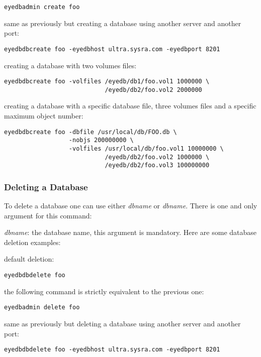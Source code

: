 \verbsize
\begin{verbatim}
eyedbadmin create foo
\end{verbatim}
\normalsize
\item same as previously but creating a database using another server
and another port:
\verbsize
\begin{verbatim}
eyedbdbcreate foo -eyedbhost ultra.sysra.com -eyedbport 8201
\end{verbatim}
\normalsize
\item creating a database with two volumes files:
\verbsize
\begin{verbatim}
eyedbdbcreate foo -volfiles /eyedb/db1/foo.vol1 1000000 \
                            /eyedb/db2/foo.vol2 2000000
\end{verbatim}
\normalsize
\item creating a database with a specific database file,
three volumes files and a specific maximum object number:
\verbsize
\begin{verbatim}
eyedbdbcreate foo -dbfile /usr/local/db/FOO.db \
                  -nobjs 200000000 \
                  -volfiles /usr/local/db/foo.vol1 10000000 \
                            /eyedb/db2/foo.vol2 1000000 \
                            /eyedb/db2/foo.vol3 100000000
\end{verbatim}
\normalsize
\ei
\subsubsection{Deleting a Database}
To delete a database one can use either  \emph{dbname}
or  \emph{dbname}.
There is one and only argument for this command:
\bi
\item \emph{dbname}: the database name, this argument is mandatory.
\ei
Here are some database deletion examples:
\bi
\item default deletion:
\verbsize
\begin{verbatim}
eyedbdbdelete foo
\end{verbatim}
\normalsize
\item the following command is strictly equivalent to the previous one:
\verbsize
\begin{verbatim}
eyedbadmin delete foo
\end{verbatim}
\normalsize
\item same as previously but deleting a database using another server
and another port:
\verbsize
\begin{verbatim}
eyedbdbdelete foo -eyedbhost ultra.sysra.com -eyedbport 8201
\end{verbatim}
\normalsize
\ei
